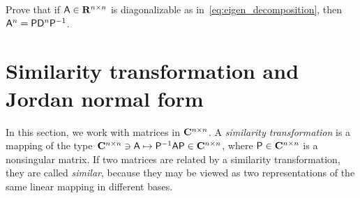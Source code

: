 \begin{exercise}
    Prove that if $\mathsf A \in \mathbf R^{n \times n}$ is diagonalizable as in~\eqref{eq:eigen_decomposition},
    then $\mathsf A^n = \mathsf P \mathsf D^n \mathsf P^{-1}$.
\end{exercise}

\section{Similarity transformation and Jordan normal form}%
\label{sec:similarity_transformation_and_jordan_normal_form}
In this section, we work with matrices in $\mathbf C^{n \times n}$.
A \emph{similarity transformation} is a mapping of the type~$\mathbf C^{n \times n} \ni \mathsf A \mapsto \mathsf P^{-1} \mathsf A \mathsf P \in \mathbf C^{n \times n}$,
where $\mathsf P \in \mathbf C^{n \times n}$ is a nonsingular matrix.
If two matrices are related by a similarity transformation,
they are called \emph{similar},
because they may be viewed as two representations of the same linear mapping in different bases.

